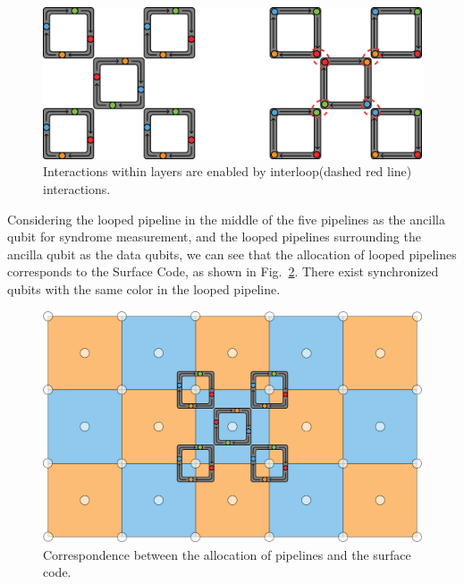 \documentclass[a4paper,11pt]{ltjsarticle}
\begin{document}
{{        \begin{figure}[h]
            \centering
            \includegraphics[scale=0.25]{figure/looped_pipeline_surface_code.eps}
            \vspace{0pt}\caption{Interactions within layers are enabled by interloop(dashed red line) interactions.}
            \label{looped_pipeline_surface_code}
            \vspace{-10pt}
        \end{figure}

        Considering the looped pipeline in the middle of the five pipelines as the ancilla qubit for syndrome measurement, and the looped pipelines surrounding the ancilla qubit as the data qubits, we can see that the allocation of looped pipelines corresponds to the Surface Code, as shown in Fig.~\ref{looped_pipeline_weak_surface_code}. There exist synchronized qubits with the same color in the looped pipeline.

        \begin{figure}[h]
            \centering
            \includegraphics[scale=0.20]{figure/looped_pipeline_weak_surface_code.eps}
            \vspace{0pt}\caption{Correspondence between the allocation of pipelines and the surface code.}
            \label{looped_pipeline_weak_surface_code}
            \vspace{-10pt}
        \end{figure} 

}}
\end{document}
